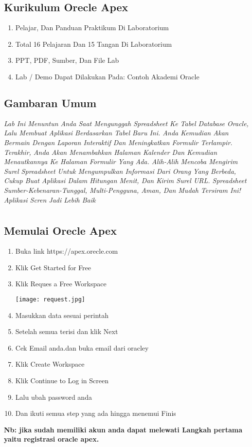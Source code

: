 \documentclass[a4paper,12pt]{report}
\begin{document}
\section{Kurikulum Orecle Apex}
\begin{enumerate}
    \item Pelajar, Dan Panduan Praktikum Di Laboratorium
    \item Total 16 Pelajaran Dan 15 Tangan Di Laboratorium
    \item PPT, PDF, Sumber, Dan File Lab
    \item Lab / Demo Dapat Dilakukan Pada: Contoh Akademi Oracle
\end{enumerate}
\section{Gambaran Umum}
\textit{Lab Ini Menuntun Anda Saat Mengunggah Spreadsheet Ke Tabel Database Oracle, Lalu Membuat Aplikasi Berdasarkan Tabel Baru Ini.  Anda Kemudian Akan Bermain Dengan Laporan Interaktif Dan Meningkatkan Formulir Terlampir.  Terakhir, Anda Akan Menambahkan Halaman Kalender Dan Kemudian Menautkannya Ke Halaman Formulir Yang Ada.  Alih-Alih Mencoba Mengirim Surel Spreadsheet Untuk Mengumpulkan Informasi Dari Orang Yang Berbeda, Cukup Buat Aplikasi Dalam Hitungan Menit, Dan Kirim Surel URL.  Spreadsheet Sumber-Kebenaran-Tunggal, Multi-Pengguna, Aman, Dan Mudah Tersiram Ini!  Aplikasi Scren Jadi Lebih Baik}

\chapter{}
\section{Memulai Orecle Apex}
\begin{enumerate}
    \item Buka link https://apex.orecle.com
    \item Klik Get Started for Free
    \item Klik Reques a Free Workspace
    \begin{center}
    \texttt{[image: request.jpg]}
    \end{center}
    \item Masukkan data sesuai perintah 
    \item Setelah semua terisi dan klik Next
    \item Cek Email anda.dan buka email dari oracley
    \item Klik Create Workspace
    \item Klik Continue to Log in Screen
    \item Lalu ubah password anda
    \item Dan ikuti semua step yang ada hingga menemui Finis
\end{enumerate}
\textbf{Nb: jika sudah memiliki akun anda dapat melewati Langkah pertama yaitu registrasi oracle apex.}
\end{document}

